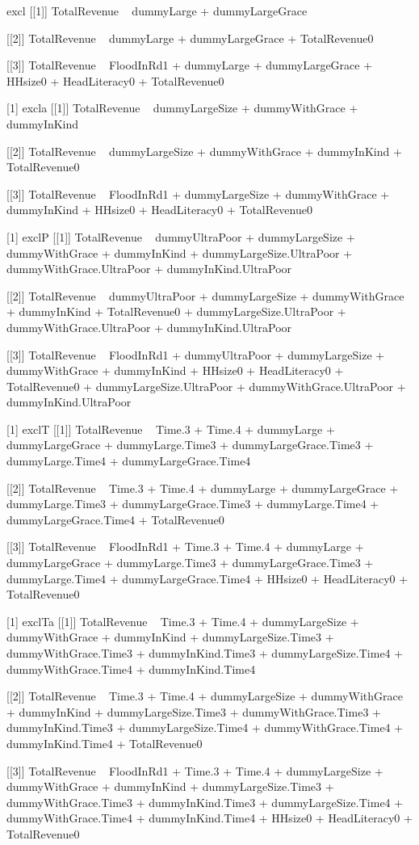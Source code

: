 \begin{Schunk}
\begin{Soutput}
[1] excl
[[1]]
TotalRevenue ~ dummyLarge + dummyLargeGrace

[[2]]
TotalRevenue ~ dummyLarge + dummyLargeGrace + TotalRevenue0

[[3]]
TotalRevenue ~ FloodInRd1 + dummyLarge + dummyLargeGrace + HHsize0 + 
    HeadLiteracy0 + TotalRevenue0

[1] excla
[[1]]
TotalRevenue ~ dummyLargeSize + dummyWithGrace + dummyInKind

[[2]]
TotalRevenue ~ dummyLargeSize + dummyWithGrace + dummyInKind + 
    TotalRevenue0

[[3]]
TotalRevenue ~ FloodInRd1 + dummyLargeSize + dummyWithGrace + 
    dummyInKind + HHsize0 + HeadLiteracy0 + TotalRevenue0

[1] exclP
[[1]]
TotalRevenue ~ dummyUltraPoor + dummyLargeSize + dummyWithGrace + 
    dummyInKind + dummyLargeSize.UltraPoor + dummyWithGrace.UltraPoor + 
    dummyInKind.UltraPoor

[[2]]
TotalRevenue ~ dummyUltraPoor + dummyLargeSize + dummyWithGrace + 
    dummyInKind + TotalRevenue0 + dummyLargeSize.UltraPoor + 
    dummyWithGrace.UltraPoor + dummyInKind.UltraPoor

[[3]]
TotalRevenue ~ FloodInRd1 + dummyUltraPoor + dummyLargeSize + 
    dummyWithGrace + dummyInKind + HHsize0 + HeadLiteracy0 + 
    TotalRevenue0 + dummyLargeSize.UltraPoor + dummyWithGrace.UltraPoor + 
    dummyInKind.UltraPoor

[1] exclT
[[1]]
TotalRevenue ~ Time.3 + Time.4 + dummyLarge + dummyLargeGrace + 
    dummyLarge.Time3 + dummyLargeGrace.Time3 + dummyLarge.Time4 + 
    dummyLargeGrace.Time4

[[2]]
TotalRevenue ~ Time.3 + Time.4 + dummyLarge + dummyLargeGrace + 
    dummyLarge.Time3 + dummyLargeGrace.Time3 + dummyLarge.Time4 + 
    dummyLargeGrace.Time4 + TotalRevenue0

[[3]]
TotalRevenue ~ FloodInRd1 + Time.3 + Time.4 + dummyLarge + dummyLargeGrace + 
    dummyLarge.Time3 + dummyLargeGrace.Time3 + dummyLarge.Time4 + 
    dummyLargeGrace.Time4 + HHsize0 + HeadLiteracy0 + TotalRevenue0

[1] exclTa
[[1]]
TotalRevenue ~ Time.3 + Time.4 + dummyLargeSize + dummyWithGrace + 
    dummyInKind + dummyLargeSize.Time3 + dummyWithGrace.Time3 + 
    dummyInKind.Time3 + dummyLargeSize.Time4 + dummyWithGrace.Time4 + 
    dummyInKind.Time4

[[2]]
TotalRevenue ~ Time.3 + Time.4 + dummyLargeSize + dummyWithGrace + 
    dummyInKind + dummyLargeSize.Time3 + dummyWithGrace.Time3 + 
    dummyInKind.Time3 + dummyLargeSize.Time4 + dummyWithGrace.Time4 + 
    dummyInKind.Time4 + TotalRevenue0

[[3]]
TotalRevenue ~ FloodInRd1 + Time.3 + Time.4 + dummyLargeSize + 
    dummyWithGrace + dummyInKind + dummyLargeSize.Time3 + dummyWithGrace.Time3 + 
    dummyInKind.Time3 + dummyLargeSize.Time4 + dummyWithGrace.Time4 + 
    dummyInKind.Time4 + HHsize0 + HeadLiteracy0 + TotalRevenue0
\end{Soutput}
\end{Schunk}




